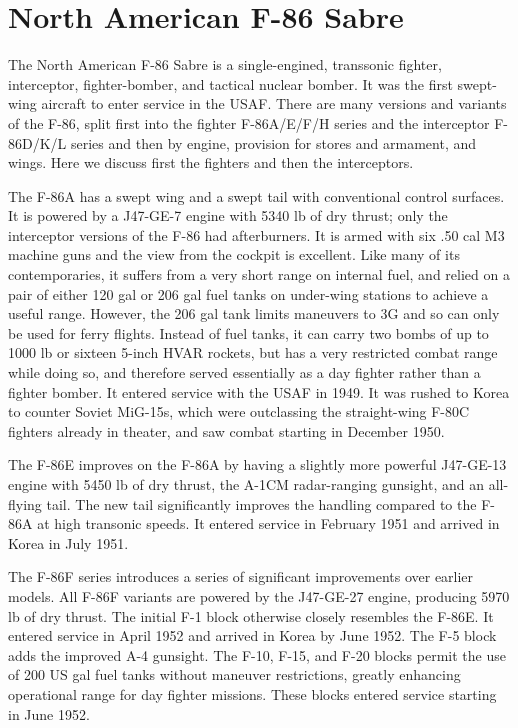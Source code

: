 \section{North American F-86 Sabre}

The North American F-86 Sabre is a single-engined, transsonic fighter, interceptor, fighter-bomber, and tactical nuclear bomber. It was the first swept-wing aircraft to enter service in the USAF. There are many versions and variants of the F-86, split first into the fighter F-86A/E/F/H series and the interceptor F-86D/K/L series and then by engine, provision for stores and armament, and wings. Here we discuss first the fighters and then the interceptors.

The F-86A has a swept wing and a swept tail with conventional control surfaces. It is powered by a J47-GE-7 engine with 5340 lb of dry thrust; only the interceptor versions of the F-86 had afterburners. It is armed with six .50 cal M3 machine guns and the view from the cockpit is excellent. Like many of its contemporaries, it suffers from a very short range on internal fuel, and relied on a pair of either 120 gal or 206 gal fuel tanks on under-wing stations to achieve a useful range. However, the 206 gal tank limits maneuvers to 3G and so can only be used for ferry flights. Instead of fuel tanks, it can carry two bombs of up to 1000 lb or sixteen 5-inch HVAR rockets, but has a very restricted combat range while doing so, and therefore served essentially as a day fighter rather than a fighter bomber. It entered service with the USAF in 1949. It was rushed to Korea to counter Soviet MiG-15s, which were outclassing the straight-wing F-80C fighters already in theater, and saw combat starting in December 1950.

The F-86E improves on the F-86A by having a slightly more powerful J47-GE-13 engine with 5450 lb of dry thrust, the A-1CM radar-ranging gunsight, and an all-flying tail. The new tail significantly improves the handling compared to the F-86A at high transonic speeds. It entered service in February 1951 and arrived in Korea in July 1951.

The F-86F series introduces a series of significant improvements over earlier models. All F-86F variants are powered by the J47-GE-27 engine, producing 5970 lb of dry thrust. The initial F-1 block otherwise closely resembles the F-86E. It entered service in April 1952 and arrived in Korea by June 1952. The F-5 block adds the improved A-4 gunsight. The F-10, F-15, and F-20 blocks permit the use of 200 US gal fuel tanks without maneuver restrictions, greatly enhancing operational range for day fighter missions. These blocks entered service starting in June 1952.

